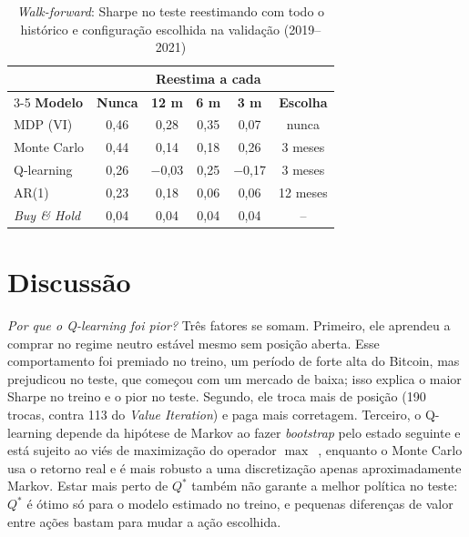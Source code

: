 \documentclass[conference]{IEEEtran}
\begin{document}
\begin{table}[!t]
  \centering
  \caption{\textit{Walk-forward}: Sharpe no teste reestimando com todo o histórico e configuração escolhida na validação (2019--2021)}
  \label{tab:walkforward}
  \footnotesize
  \setlength{\tabcolsep}{4pt}
  \renewcommand{\arraystretch}{1.1}
  \begin{tabular}{l c ccc c}
    \toprule
    & & \multicolumn{3}{c}{\textbf{Reestima a cada}} & \\
    \cmidrule(lr){3-5}
    \textbf{Modelo} & \textbf{Nunca} & \textbf{12 m} & \textbf{6 m} & \textbf{3 m} & \textbf{Escolha} \\
    \midrule
    MDP (VI)              & 0,46 & 0,28    & 0,35 & 0,07    & nunca    \\
    Monte Carlo           & 0,44 & 0,14    & 0,18 & 0,26    & 3 meses  \\
    Q-learning            & 0,26 & $-$0,03 & 0,25 & $-$0,17 & 3 meses  \\
    AR(1)                 & 0,23 & 0,18    & 0,06 & 0,06    & 12 meses \\
    \textit{Buy \& Hold}  & 0,04 & 0,04    & 0,04 & 0,04    & --       \\
    \bottomrule
  \end{tabular}
\end{table}

\section{Discussão}
\label{sec:discussao}

\textit{Por que o Q-learning foi pior?} Três fatores se somam. Primeiro, ele aprendeu a comprar no regime neutro estável mesmo sem posição aberta. Esse comportamento foi premiado no treino, um período de forte alta do Bitcoin, mas prejudicou no teste, que começou com um mercado de baixa; isso explica o maior Sharpe no treino e o pior no teste. Segundo, ele troca mais de posição (190 trocas, contra 113 do \textit{Value Iteration}) e paga mais corretagem. Terceiro, o Q-learning depende da hipótese de Markov ao fazer \textit{bootstrap} pelo estado seguinte e está sujeito ao viés de maximização do operador $\max$~\cite{sutton2018}, enquanto o Monte Carlo usa o retorno real e é mais robusto a uma discretização apenas aproximadamente Markov. Estar mais perto de $Q^*$ também não garante a melhor política no teste: $Q^*$ é ótimo só para o modelo estimado no treino, e pequenas diferenças de valor entre ações bastam para mudar a ação escolhida.
\end{document}
